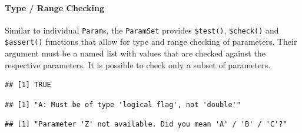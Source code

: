 \documentclass[
]{scrbook}
\newenvironment{Shaded}{\begin{snugshade}}{\end{snugshade}}
\newcommand{\AttributeTok}[1]{\textcolor[rgb]{0.77,0.63,0.00}{#1}}
\newcommand{\ConstantTok}[1]{\textcolor[rgb]{0.00,0.00,0.00}{#1}}
\newcommand{\DecValTok}[1]{\textcolor[rgb]{0.00,0.00,0.81}{#1}}
\newcommand{\FunctionTok}[1]{\textcolor[rgb]{0.00,0.00,0.00}{#1}}
\newcommand{\NormalTok}[1]{#1}
\newcommand{\SpecialCharTok}[1]{\textcolor[rgb]{0.00,0.00,0.00}{#1}}
\renewenvironment{Shaded} {\begin{snugshade}\small} {\end{snugshade}}
\begin{document}
\hypertarget{type-range-checking-1}{%
\paragraph{Type / Range Checking}\label{type-range-checking-1}}

Similar to individual \texttt{Param}s, the \texttt{ParamSet} provides \texttt{\$test()}, \texttt{\$check()} and \texttt{\$assert()} functions that allow for type and range checking of parameters.
Their argument must be a named list with values that are checked against the respective parameters.
It is possible to check only a subset of parameters.

\begin{Shaded}
\end{Shaded}

\begin{verbatim}
## [1] TRUE
\end{verbatim}

\begin{Shaded}
\end{Shaded}

\begin{verbatim}
## [1] "A: Must be of type 'logical flag', not 'double'"
\end{verbatim}

\begin{Shaded}
\end{Shaded}

\begin{verbatim}
## [1] "Parameter 'Z' not available. Did you mean 'A' / 'B' / 'C'?"
\end{verbatim}
\end{document}
